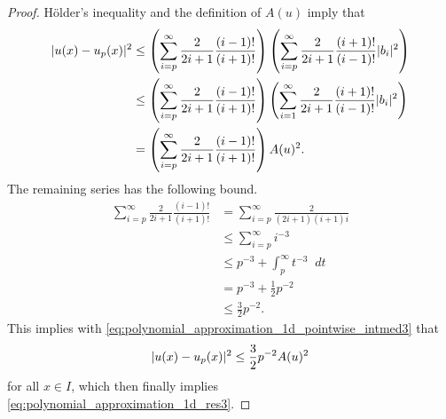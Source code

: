 \documentclass[english, 12pt, a4paper, sci, utf8, a-2b, online]{aaltothesis}
\theoremstyle{definition}
\theoremstyle{plain}
\DeclarePairedDelimiter\abs{\lvert}{\rvert}
\newcommand*\diff{\mathop{}\!d}
\numberwithin{equation}{section}
\begin{document}
\begin{proof}
    Hölder's inequality and the definition of $A(u)$ imply that
    \begin{align}
        \abs{u(x) - u_p(x)}^2
        &\leq \left( \sum_{i=p}^{\infty} \frac{2}{2i+1} \frac{(i-1)!}{(i+1)!}
            \right)
            \left( \sum_{i=p}^{\infty} \frac{2}{2i+1} \frac{(i+1)!}{(i-1)!} 
            \abs{b_i}^2 \right) \nonumber \\
        &\leq \left( \sum_{i=p}^{\infty} \frac{2}{2i+1} \frac{(i-1)!}{(i+1)!}
            \right)
            \left( \sum_{i=1}^{\infty} \frac{2}{2i+1} \frac{(i+1)!}{(i-1)!} 
            \abs{b_i}^2 \right) \nonumber \\
        \label{eq:polynomial_approximation_1d_pointwise_intmed3}
        &= \left( \sum_{i=p}^{\infty} \frac{2}{2i+1} \frac{(i-1)!}{(i+1)!}
            \right) A(u)^2.
    \end{align}
    The remaining series has the following bound.
    \begin{align*}
        \sum_{i=p}^{\infty} \frac{2}{2i+1} \frac{(i-1)!}{(i+1)!}
        &= \sum_{i=p}^{\infty} \frac{2}{(2i+1)(i+1)i} \\
        &\leq \sum_{i=p}^{\infty} i^{-3} \\
        &\leq p^{-3} + \int_{p}^{\infty} t^{-3} \diff t \\
        &= p^{-3} + \frac{1}{2} p^{-2} \\
        &\leq \frac{3}{2} p^{-2}.
    \end{align*}
    This implies with \eqref{eq:polynomial_approximation_1d_pointwise_intmed3} that
    \begin{equation*}
        \abs{u(x) - u_p(x)}^2
        \leq \frac{3}{2} p^{-2} A(u)^2
    \end{equation*}
    for all $x \in I$, which then finally implies 
    \eqref{eq:polynomial_approximation_1d_res3}.
\end{proof}
\end{document}
